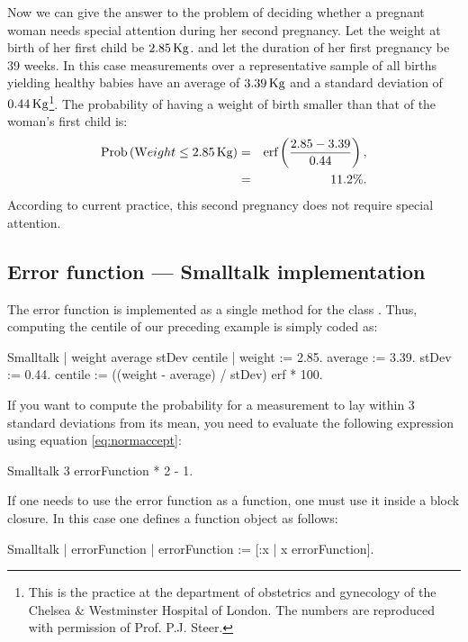 \def\w{2.85}\def\av{3.39}\def\st{0.44}
 Now we can give the answer to the problem of deciding
whether a pregnant woman needs special attention during her second
pregnancy. Let the weight at birth of her first child be $\w\kg$.
and let the duration of her first pregnancy be 39 weeks. In this
case measurements over a representative sample of all births
yielding healthy babies have an average of $\av\kg$ and a standard
deviation of $\st\kg$\footnote{\label{ft:steer}This is the
practice at the department of obstetrics and gynecology of the
Chelsea $\&$ Westminster Hospital of London. The numbers are
reproduced with permission of Prof. P.J. Steer.}. The probability
of having a weight of birth smaller than that of the woman's first
child is:
\begin{eqnarray*}
\prob\left(\mathop{\textrm Weight}\le \w\kg \right) & = &
\erf\left({\w-\av\over\st}\right),\\ & = & 11.2\%.
\end{eqnarray*}
According to current practice, this second pregnancy does not
require special attention.

\subsection{Error function --- Smalltalk implementation}
\label{sec:sterrorfunction}
The error function is implemented as a single method for the class . Thus,
computing the centile of our preceding example is simply coded as:
\begin{displaycode}{Smalltalk}
| weight average stDev centile |
weight := 2.85.
average := 3.39.
stDev := 0.44.
centile := ((weight - average) / stDev) erf * 100.
\end{displaycode}
If you want to compute the probability for a measurement to lay
within 3 standard deviations from its mean, you need to evaluate
the following expression using equation \ref{eq:normaccept}:
\begin{displaycode}{Smalltalk}
3 errorFunction * 2 - 1.
\end{displaycode}
If one needs to use the error function as a function, one must use
it inside a block closure. In this case one defines a function
object as follows:
\begin{displaycode}{Smalltalk}
| errorFunction |
errorFunction := [:x | x errorFunction].
\end{displaycode}

